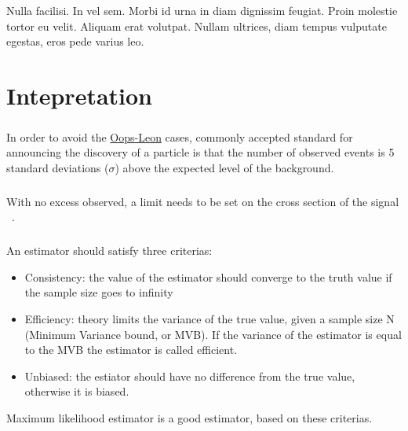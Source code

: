 \begin{savequote}[75mm]
Nulla facilisi. In vel sem. Morbi id urna in diam dignissim feugiat. Proin molestie tortor eu velit. Aliquam erat volutpat. Nullam ultrices, diam tempus vulputate egestas, eros pede varius leo.
\end{savequote}

\chapter{Intepretation}

\paragraph{}
In order to avoid the \href{https://en.wikipedia.org/wiki/Oops-Leon}{Oops-Leon} cases, commonly accepted standard for announcing the discovery of a particle is that the number of observed events is 5 standard deviations ($\sigma$) above the expected level of the background.

\paragraph{}
With no excess observed, a limit needs to be set on the cross section of the signal ~\cite{Stat-asym}. 

\paragraph{}
An estimator should satisfy three criterias:
\begin{itemize}
	\item Consistency: the value of the estimator should converge to the truth value if the sample size goes to infinity
	\item Efficiency: theory limits the variance of the true value, given a sample size N (Minimum Variance bound, or MVB). If the variance of the estimator is equal to the MVB the estimator is called efficient.
	\item Unbiased: the estiator should have no difference from the true value, otherwise it is biased.
\end{itemize}
Maximum likelihood estimator is a good estimator, based on these criterias.